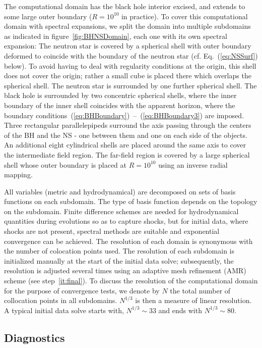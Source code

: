 

The computational domain has the black hole interior excised, and
extends to some large outer boundary ($R=10^{10}$ in practice). To
cover this computational domain with spectral expansions, we split the
domain into multiple subdomains as indicated in
figure~\ref{fig:BHNSDomain}, each one with its own spectral expansion:
The neutron star is covered by a spherical shell with outer boundary
deformed to coincide with the boundary of the neutron star
(cf. Eq.~(\ref{eq:NSSurf}) below). To avoid having to deal with
regularity conditions at the origin, this shell does not cover the
origin; rather a small cube is placed there which overlaps the
spherical shell. The neutron star is surrounded by one further
spherical shell. The black hole is surrounded by two concentric
spherical shells, where the inner boundary of the inner shell
coincides with the apparent horizon, where the boundary
conditions~(\ref{eq:BHBoundary})~--~(\ref{eq:BHBoundary3}) are imposed.
Three rectangular parallelepipeds surround the axis passing through the
centers of the BH and the NS - one between them and one on each side
of the objects. An additional eight cylindrical shells are placed
around the same axis to cover the intermediate field region. The
far-field region is covered by a large spherical shell whose outer
boundary is placed at $R=10^{10}$ using an inverse radial
mapping.

All variables (metric and hydrodynamical) are decomposed on sets of
basis functions on each subdomain. The type of basis function depends
on the topology on the subdomain. Finite difference schemes are needed
for hydrodynamical quantities during evolutions so as to capture
shocks, but for initial data, where shocks are not present, spectral
methods are suitable and exponential convergence can be achieved. The
resolution of each domain is synonymous with the number of colocation
points used. The resolution of each subdomain is initialized manually
at the start of the initial data solve; subsequently, the resolution
is adjusted several times using an adaptive mesh refinement (AMR) scheme (see
step~\ref{it:final}). To discuss the resolution of the computational
domain for the purpose of convergence tests, we denote by $N$
the total number of collocation points in all subdomains. $N^{1/3}$ is then a measure of linear resolution.
A typical initial data solve starts with, $N^{1/3}\sim 33$ and ends
with $N^{1/3}\sim 80$.

\subsection{Diagnostics}


